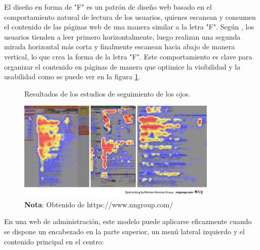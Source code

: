 		El diseño en forma de "F" es un patrón de diseño web basado en el comportamiento natural de lectura de los usuarios, quienes escanean y consumen el contenido de las páginas web de una manera similar a la letra "F". Según \textcite{nielsen2006fshaped}, los usuarios tienden a leer primero horizontalmente, luego realizan una segunda mirada horizontal más corta y finalmente escanean hacia abajo de manera vertical, lo que crea la forma de la letra "F". Este comportamiento es clave para organizar el contenido en páginas de manera que optimice la visibilidad y la usabilidad como se puede ver en la figura \ref{fig:figura2_4}.
		
		\vspace{0.3cm} %
		
		\begin{figure}[h] %
			\caption[Estudios de seguimiento ocular]
			{\newline Resultados de los estudios de seguimiento de los ojos.} %
			\vspace{0.3cm}
			\centering
			\includegraphics[width=0.85\textwidth]{imagenes/figura2_4.jpg} %
			\vspace{0.3cm}
			\caption*{\textup{\textbf{Nota}: Obtenido de https://www.nngroup.com/}}
			\vspace{-0.8cm}
			\label{fig:figura2_4} %
		\end{figure}
		
		En una web de administración, este modelo puede aplicarse eficazmente cuando se dispone un encabezado en la parte superior, un menú lateral izquierdo y el contenido principal en el centro:
		
